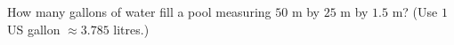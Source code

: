 How many gallons of water fill a pool measuring $50$ m by $25$ m by $1.5$ m? (Use $1$ US gallon $\approx3.785$ litres.)
